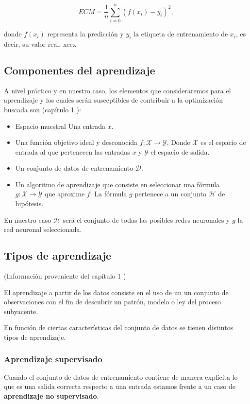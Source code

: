 $$ECM = \frac{1}{n} \sum_{i=0} ^n (f(x_i) - y_i)^2,$$

donde $f(x_i)$ representa la predicción y $y_i$ la etiqueta de entrenamiento de $x_i$, es decir, su valor real. xccx

\subsection{Componentes del aprendizaje}  
A nivel práctico y en nuestro caso, los elementos que consideraremos para el aprendizaje y los cuales 
serán susceptibles de contribuir a la optimización buscada son
(capítulo 1 \cite{MostafaLearningFromData}): 


\begin{itemize}
    \item Espacio muestral Una entrada $x$. 
    \item Una función objetivo ideal y desconocida
     $f: \mathcal X \longrightarrow \mathcal{Y}$. 
     Donde  $\mathcal X$ es el espacio de entrada al que pertenecen las entradas $x$ y $\mathcal{Y}$ el espacio de salida. 
    \item Un conjunto de datos de entrenamiento $\mathcal D.$
    \item Un algoritmo de aprendizaje que consiste en seleccionar una fórmula $g: \mathcal X \longrightarrow \mathcal{Y}$ que aproxime $f$. La fórmula $g$ pertenece 
    a un conjunto $\mathcal H$ de hipótesis. 
\end{itemize}

En nuestro caso $\mathcal{H}$ será el conjunto de todas las posibles redes neuronales y $g$ la red neuronal seleccionada. 


\subsection{Tipos de aprendizaje}  

(Información proveniente del capítulo 1 \cite{MostafaLearningFromData})

El aprendizaje a partir de los datos consiste en el uso de un 
un conjunto de observaciones con el fin de descubrir un patrón, modelo o ley del proceso subyacente. 

En función de ciertas características del conjunto de datos se 
tienen distintos tipos de aprendizaje.  

\subsubsection{Aprendizaje supervisado}
Cuando el conjunto de datos de entrenamiento contiene de manera explícita lo que es una salida correcta respecto a una entrada estamos frente a un caso de \textbf{aprendizaje no supervisado}.   

